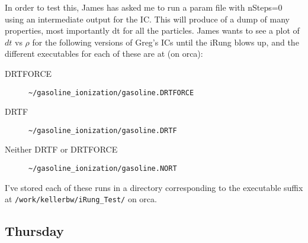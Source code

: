 \documentclass[11pt,letterpaper]{article}
\begin{document}
In order to test this, James has asked me to run a param file with nSteps=0 
using an intermediate output for the IC.  This will produce of a dump of many
properties, most importantly dt for all the particles.  James wants to see
a plot of $dt$ vs $\rho$ for the following versions of Greg's ICs until the
iRung blows up, and the different executables for each of these are at (on
orca):
\begin{description}
\item[DRTFORCE] \verb!~/gasoline_ionization/gasoline.DRTFORCE!
\item[DRTF] \verb!~/gasoline_ionization/gasoline.DRTF!
\item[Neither DRTF or DRTFORCE] \verb!~/gasoline_ionization/gasoline.NORT!
\end{description}
I've stored each of these runs in a directory corresponding to the executable
suffix at \verb!/work/kellerbw/iRung_Test/! on orca.
\subsection*{Thursday}
\end{document}
